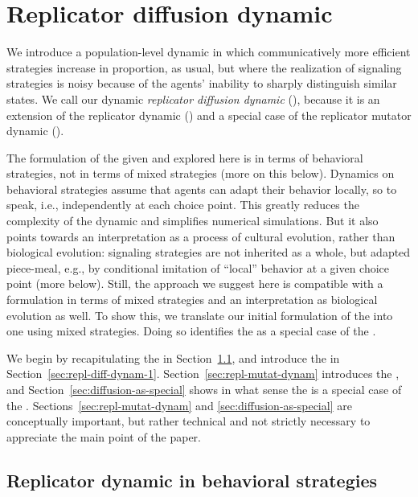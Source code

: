 \documentclass[fleqn,reqno,10pt]{article}
\newcommand{\rd}{\acro{rd}} %
\newcommand{\rmd}{\acro{rmd}} %
\newcommand{\rdd}{\acro{rdd}} %
\begin{document}

\section{Replicator diffusion dynamic}
\label{sec:repl-diff-dynam}

We introduce a population-level dynamic in which communicatively more
efficient strategies increase in proportion, as usual, but where the
realization of signaling strategies is noisy because of the agents'
inability to sharply distinguish similar states. We call our dynamic
\emph{replicator diffusion dynamic} (\rdd), because it is an extension
of the replicator dynamic (\rd) and a special case of the replicator
mutator dynamic (\rmd).

The formulation of the \rdd given and explored here is in terms of
behavioral strategies, not in terms of mixed strategies (more on this
below). Dynamics on behavioral strategies assume that agents can adapt
their behavior locally, so to speak, i.e., independently at each
choice point. This greatly reduces the complexity of the dynamic and
simplifies numerical simulations. But it also points towards an
interpretation as a process of cultural evolution, rather than
biological evolution: signaling strategies are not inherited as a
whole, but adapted piece-meal, e.g., by conditional imitation of
``local'' behavior at a given choice point (more below). Still, the
approach we suggest here is compatible with a formulation in terms of
mixed strategies and an interpretation as biological evolution as
well. To show this, we translate our initial formulation of the \rdd
into one using mixed strategies. Doing so identifies the \rdd as a
special case of the \rmd.

We begin by recapitulating the \rd in
Section~\ref{sec:repl-dynam-behav}, and introduce the \rdd in
Section~\ref{sec:repl-diff-dynam-1}.
Section~\ref{sec:repl-mutat-dynam} introduces the \rmd, and
Section~\ref{sec:diffusion-as-special} shows in what sense the \rdd is
a special case of the \rmd. Sections~\ref{sec:repl-mutat-dynam} and
\ref{sec:diffusion-as-special} are conceptually important, but rather
technical and not strictly necessary to appreciate the main point of
the paper.

\subsection{Replicator dynamic in behavioral strategies}
\label{sec:repl-dynam-behav}
\end{document}
